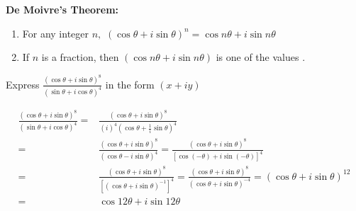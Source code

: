 \begin{theorem}
	\textbf{De Moivre's Theorem:}
	\begin{enumerate}
		\item For any integer $n,$ $(\cos \theta+i \sin \theta)^{n}=\cos n \theta+i \sin n \theta$
		\item 	If $n$ is a fraction, then $(\cos n \theta+i \sin n \theta)$ is one of the values .
	\end{enumerate}
\end{theorem}
\begin{exercise}
  Express $\frac{(\cos \theta+i \sin \theta)^{8}}{(\sin \theta+i \cos \theta)^{4}}$ in the form $(x+i y)$
\end{exercise}
\begin{answer}
	$$
	\begin{aligned}
	\frac{(\cos \theta+i \sin \theta)^{8}}{(\sin \theta+i \cos \theta)^{4}}=&\frac{(\cos \theta+i \sin \theta)^{8}}{(i)^{4}\left(\cos \theta+\frac{1}{i} \sin \theta\right)^{4}} \\
	=& \frac{(\cos \theta+i \sin \theta)^{8}}{(\cos \theta-i \sin \theta)^{4}}=\frac{(\cos \theta+i \sin \theta)^{8}}{[\cos (-\theta)+i \sin (-\theta)]^{4}} \\
	=& \frac{(\cos \theta+i \sin \theta)^{8}}{\left[(\cos \theta+i \sin \theta)^{-1}\right]^{4}}=\frac{(\cos \theta+i \sin \theta)^{8}}{(\cos \theta+i \sin \theta)^{-4}}=(\cos \theta+i \sin \theta)^{12} \\
	=& \cos 12 \theta+i \sin 12 \theta
	\end{aligned}
	$$
\end{answer}
